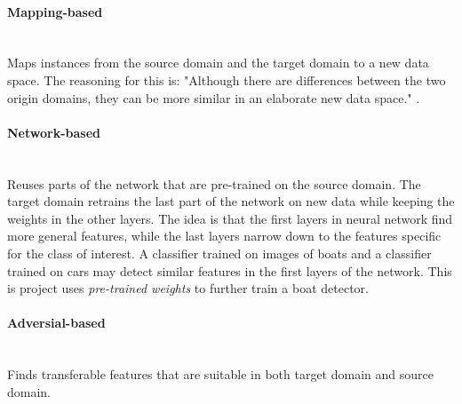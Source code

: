\paragraph{Mapping-based}\mbox{}\\
Maps instances from the source domain and the target domain to a new data space. The reasoning for this is: "Although there are differences between the two origin domains, they can be more similar in an elaborate new data space." \citep{TransferLearning2}.

\newpage

\paragraph{Network-based}\mbox{}\\
Reuses parts of the network that are pre-trained on the source domain. The target domain retrains the last part of the network on new data while keeping the weights in the other layers. The idea is that the first layers in neural network find more general features, while the last layers narrow down to the features specific for the class of interest. A classifier trained on images of boats and a classifier trained on cars may detect similar features in the first layers of the network. This is project uses \textit{pre-trained weights} to further train a boat detector.

\paragraph{Adversial-based}\mbox{}\\
Finds transferable features that are suitable in both target domain and source domain.



\cleardoublepage